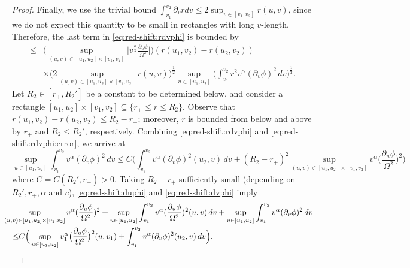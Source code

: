 \documentclass[12 pt, reqno]{amsart}
\theoremstyle{definition}
\theoremstyle{remark}
\numberwithin{equation}{section}
\newcommand{\abs}[1]{\vert#1\vert}
\newcommand{\set}[1]{\{#1\}}
\newcommand{\ud}{d}
\newcommand{\rd}{\partial}
\newcommand{\bb}{\Big}
\newcommand{\0}{\emptyset}
\newcommand{\alp}{\alpha}
\newcommand{\Omg}{\Omega}
\begin{document}
\begin{proof}
Finally, we use the trivial bound $\int_{v_{1}}^{v_{2}} \rd_v r \ud v \leq 2 \sup_{v \in [v_{1}, v_{2}]} r(u, v)$, since we do not expect this quantity to be small in rectangles with long $v$-length.
Therefore, the last term in \eqref{eq:red-shift:rdvphi} is bounded by
\begin{equation} \label{eq:red-shift:rdvphi:error}
\begin{aligned}
\leq & \bb(\sup_{(u, v) \in [u_{1}, u_{2}] \times [v_{1}, v_{2}]} \abs{v^{\frac{\alp}{2}} \frac{\rd_{u} \phi}{\Omg^{2}}} \bb)  (r(u_{1}, v_{2}) - r(u_{2}, v_{2})) \\
	& \times \bb(2 \sup_{(u, v) \in [u_{1}, u_{2}] \times [v_{1}, v_{2}]} r(u, v) \bb)^{\frac{1}{2}} \sup_{u \in [u_{1}, u_{2}]} \bb( \int_{v_{1}}^{v_{2}} r^{2} v^{\alp} (\rd_{v} \phi)^{2} \, \ud v \bb)^{\frac{1}{2}}.
\end{aligned}
\end{equation}
Let $R_{2}\in [r_+,R_2']$ be a constant to be determined below, and consider a rectangle $[u_{1}, u_{2}] \times [v_{1}, v_{2}] \subseteq \set{r_{+} \leq r \leq R_{2}}$. Observe that $r(u_{1}, v_{2}) - r(u_{2}, v_{2}) \leq R_{2} - r_{+}$; moreover, $r$ is bounded from below and above by $r_{+}$ and $R_{2} \leq R_{2}'$, respectively. Combining \eqref{eq:red-shift:rdvphi} and \eqref{eq:red-shift:rdvphi:error}, we arrive at
\begin{equation} \label{eq:red-shift:dvphi}
	\sup_{u \in [u_{1}, u_{2}]} \int_{v_{1}}^{v_{2}} v^{\alp} (\rd_{v} \phi)^{2} \, \ud v
	\leq C \bb( \int_{v_{1}}^{v_{2}} v^{\alp} (\rd_{v} \phi)^{2}(u_{2}, v) \, \ud v + (R_{2} - r_{+})^{2} \sup_{(u, v) \in [u_{1}, u_{2}] \times [v_{1}, v_{2}]} v^{\alp} \big(\frac{\rd_{u} \phi}{\Omg^{2}}\big)^{2} \bb)
\end{equation}
where $C = C(R_{2}', r_{+}) > 0$. Taking $R_{2} - r_{+}$ sufficiently small (depending on $R_{2}', r_{+}, \alp$ and $c$), \eqref{eq:red-shift:duphi} and \eqref{eq:red-shift:dvphi} imply
\begin{equation} \label{eq:red-shift:combine}
\begin{aligned}
& \hskip-2em
	\sup_{(u, v) \in [u_{1}, u_{2}] \times [v_{1}, v_{2}]} v^{\alp} (\frac{\rd_{u} \phi}{\Omg^{2}})^{2}
	+ \sup_{u \in [u_{1}, u_{2}] }\int_{v_{1}}^{v_{2}} v^{\alp} (\frac{\rd_{u} \phi}{\Omg^{2}})^{2} (u, v)\, \ud v 
	+ \sup_{u \in [u_{1}, u_{2}]} \int_{v_{1}}^{v_{2}} v^{\alp} (\rd_{v} \phi)^{2} \, \ud v \\
\leq & C \bb( \sup_{u \in [u_{1}, u_{2}]} v_{1}^{\alp} \big(\frac{\rd_{u} \phi}{\Omg^{2}} \big)^{2}(u, v_{1}) + \int_{v_{1}}^{v_{2}} v^{\alp} (\rd_{v} \phi)^{2} (u_{2}, v) \, \ud v \bb).

\end{aligned}
\end{equation}
\end{proof}
\end{document}
